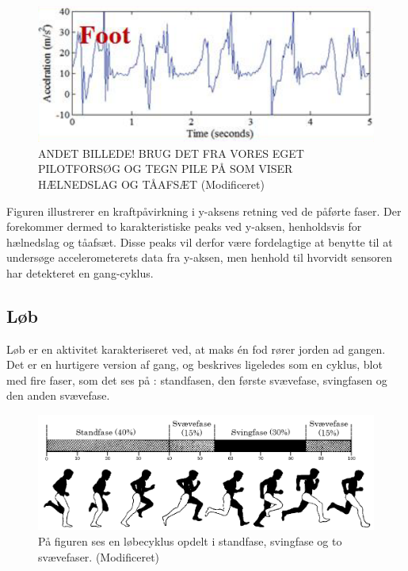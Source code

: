 \begin{figure}[H]
	\centering
	\includegraphics[scale=0.7]{figures/bProblemloesning/gang_y_acc.png}
	\caption{ANDET BILLEDE! BRUG DET FRA VORES EGET PILOTFORSØG OG TEGN PILE PÅ SOM VISER HÆLNEDSLAG OG TÅAFSÆT \citep{ClelandKikhia2013} (Modificeret)}
	\label{fig:gang_y_acc}
\end{figure}

Figuren illustrerer en kraftpåvirkning i y-aksens retning ved de påførte faser. Der forekommer dermed to karakteristiske peaks ved y-aksen, henholdsvis for hælnedslag og tåafsæt. Disse peaks vil derfor være fordelagtige at benytte til at undersøge accelerometerets data fra y-aksen, men henhold til hvorvidt sensoren har detekteret en gang-cyklus. 

\subsection{Løb}
Løb er en aktivitet karakteriseret ved, at maks én fod rører jorden ad gangen. 
Det er en hurtigere version af gang, og beskrives ligeledes som en cyklus, blot med fire faser, som det ses på : standfasen, den første svævefase, svingfasen og den anden svævefase. \citep{Adelaar1986,Novacheck1998}

\begin{figure}[H]
	\centering
	\includegraphics[scale=0.4]{figures/bProblemloesning/loeb_cyklus1.png}
	\caption{På figuren ses en løbecyklus opdelt i standfase, svingfase og to svævefaser. \citep{Adelaar1986} (Modificeret)}
	\label{fig:loebecyklus}
\end{figure}

